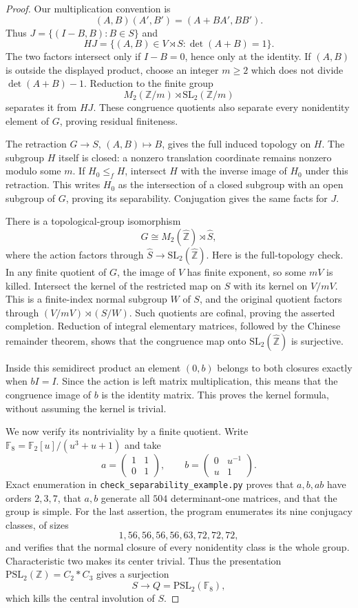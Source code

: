 \begin{proof}
Our multiplication convention is
\[
 (A,B)(A',B')=(A+BA',BB').
\]
Thus $J=\{(I-B,B):B\in S\}$ and
\[
 HJ=\{(A,B)\in V\rtimes S:\det(A+B)=1\}.
\]
The two factors intersect only if $I-B=0$, hence only at the
identity.  If $(A,B)$ is outside the displayed product, choose
an integer $m\geq2$ which does not divide
$\det(A+B)-1$.  Reduction to the finite group
\[
 M_2(\mathbb Z/m)\rtimes\mathrm{SL}_2(\mathbb Z/m)
\]
separates it from $HJ$.  These congruence quotients also
separate every nonidentity element of $G$, proving residual
finiteness.

The retraction $G\to S$, $(A,B)\mapsto B$, gives the full
induced topology on $H$.  The subgroup $H$ itself is closed:
a nonzero translation coordinate remains nonzero modulo some
$m$.  If $H_0\leq_f H$, intersect $H$ with the inverse image
of $H_0$ under this retraction.  This writes $H_0$ as the
intersection of a closed subgroup with an open subgroup of
$G$, proving its separability.  Conjugation gives the same
facts for $J$.

There is a topological-group isomorphism
\[
 \widehat G\cong
 M_2(\widehat{\mathbb Z})\rtimes\widehat S,
\]
where the action factors through
$\widehat S\to\mathrm{SL}_2(\widehat{\mathbb Z})$.
Here is the full-topology check.  In any finite quotient of
$G$, the image of $V$ has finite exponent, so some $mV$ is
killed.  Intersect the kernel of the restricted map on $S$
with its kernel on $V/mV$.  This is a finite-index normal
subgroup $W$ of $S$, and the original quotient factors through
$(V/mV)\rtimes(S/W)$.  Such quotients are cofinal, proving
the asserted completion.  Reduction of integral elementary
matrices, followed by the Chinese remainder theorem, shows
that the congruence map onto
$\mathrm{SL}_2(\widehat{\mathbb Z})$ is surjective.

Inside this semidirect product an element $(0,b)$ belongs to
both closures exactly when $bI=I$.  Since the action is left
matrix multiplication, this means that the congruence image
of $b$ is the identity matrix.  This proves the kernel formula,
without assuming the kernel is trivial.

We now verify its nontriviality by a finite quotient.  Write
$\mathbb F_8=\mathbb F_2[u]/(u^3+u+1)$ and take
\[
 a=\begin{pmatrix}1&1\\0&1\end{pmatrix},
 \qquad
 b=\begin{pmatrix}0&u^{-1}\\u&1\end{pmatrix}.
\]
Exact enumeration in
\texttt{check\_separability\_example.py} proves that $a,b,ab$
have orders $2,3,7$, that $a,b$ generate all $504$ determinant-one
matrices, and that the group is simple.  For the last assertion,
the program enumerates its nine conjugacy classes, of sizes
\[
 1,56,56,56,56,63,72,72,72,
\]
and verifies that the normal closure of every nonidentity
class is the whole group.  Characteristic two makes its center
trivial.  Thus the presentation
$\mathrm{PSL}_2(\mathbb Z)=C_2*C_3$ gives a surjection
\[
 S\longrightarrow Q=\mathrm{PSL}_2(\mathbb F_8),
\]
which kills the central involution of $S$.


\end{proof}
